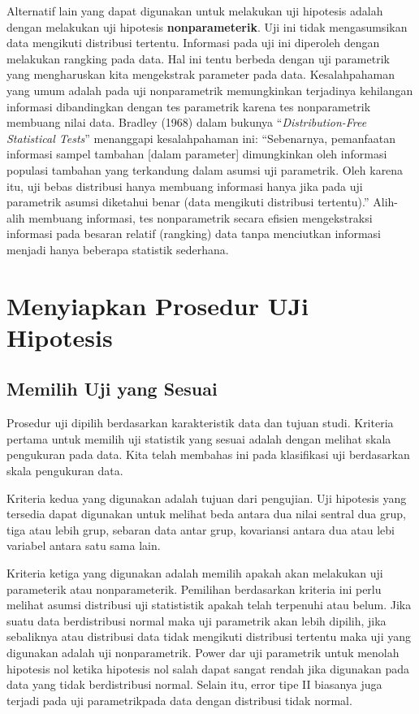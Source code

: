\documentclass[]{book}
\begin{document}
Alternatif lain yang dapat digunakan untuk melakukan uji hipotesis
adalah dengan melakukan uji hipotesis \textbf{nonparameterik}. Uji ini
tidak mengasumsikan data mengikuti distribusi tertentu. Informasi pada
uji ini diperoleh dengan melakukan rangking pada data. Hal ini tentu
berbeda dengan uji parametrik yang mengharuskan kita mengekstrak
parameter pada data. Kesalahpahaman yang umum adalah pada uji
nonparametrik memungkinkan terjadinya kehilangan informasi dibandingkan
dengan tes parametrik karena tes nonparametrik membuang nilai data.
Bradley (1968) dalam bukunya ``\emph{Distribution-Free Statistical
Tests}'' menanggapi kesalahpahaman ini: ``Sebenarnya, pemanfaatan
informasi sampel tambahan {[}dalam parameter{]} dimungkinkan oleh
informasi populasi tambahan yang terkandung dalam asumsi uji parametrik.
Oleh karena itu, uji bebas distribusi hanya membuang informasi hanya
jika pada uji parametrik asumsi diketahui benar (data mengikuti
distribusi tertentu).'' Alih-alih membuang informasi, tes nonparametrik
secara efisien mengekstraksi informasi pada besaran relatif (rangking)
data tanpa menciutkan informasi menjadi hanya beberapa statistik
sederhana.

\section{Menyiapkan Prosedur UJi
Hipotesis}\label{menyiapkan-prosedur-uji-hipotesis}

\subsection{Memilih Uji yang Sesuai}\label{memilih-uji-yang-sesuai}

Prosedur uji dipilih berdasarkan karakteristik data dan tujuan studi.
Kriteria pertama untuk memilih uji statistik yang sesuai adalah dengan
melihat skala pengukuran pada data. Kita telah membahas ini pada
klasifikasi uji berdasarkan skala pengukuran data.

Kriteria kedua yang digunakan adalah tujuan dari pengujian. Uji
hipotesis yang tersedia dapat digunakan untuk melihat beda antara dua
nilai sentral dua grup, tiga atau lebih grup, sebaran data antar grup,
kovariansi antara dua atau lebi variabel antara satu sama lain.

Kriteria ketiga yang digunakan adalah memilih apakah akan melakukan uji
parameterik atau nonparameterik. Pemilihan berdasarkan kriteria ini
perlu melihat asumsi distribusi uji statististik apakah telah terpenuhi
atau belum. Jika suatu data berdistribusi normal maka uji parametrik
akan lebih dipilih, jika sebaliknya atau distribusi data tidak mengikuti
distribusi tertentu maka uji yang digunakan adalah uji nonparametrik.
Power dar uji parametrik untuk menolah hipotesis nol ketika hipotesis
nol salah dapat sangat rendah jika digunakan pada data yang tidak
berdistribusi normal. Selain itu, error tipe II biasanya juga terjadi
pada uji parametrikpada data dengan distribusi tidak normal.
\end{document}
